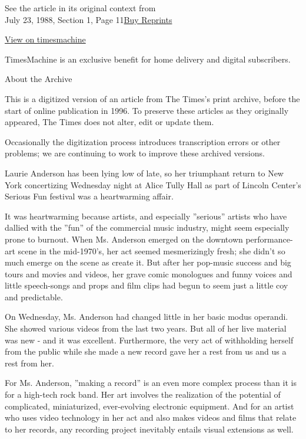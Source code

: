 See the article in its original context from\\
July 23, 1988, Section 1, Page
11\href{https://store.nytimes3xbfgragh.onion/collections/new-york-times-page-reprints?utm_source=nytimes\&utm_medium=article-page\&utm_campaign=reprints}{Buy
Reprints}

\href{http://timesmachine.nytimes3xbfgragh.onion/timesmachine/1988/07/23/054088.html}{View
on timesmachine}

TimesMachine is an exclusive benefit for home delivery and digital
subscribers.

About the Archive

This is a digitized version of an article from The Times's print
archive, before the start of online publication in 1996. To preserve
these articles as they originally appeared, The Times does not alter,
edit or update them.

Occasionally the digitization process introduces transcription errors or
other problems; we are continuing to work to improve these archived
versions.

Laurie Anderson has been lying low of late, so her triumphant return to
New York concertizing Wednesday night at Alice Tully Hall as part of
Lincoln Center's Serious Fun festival was a heartwarming affair.

It was heartwarming because artists, and especially ''serious'' artists
who have dallied with the ''fun'' of the commercial music industry,
might seem especially prone to burnout. When Ms. Anderson emerged on the
downtown performance-art scene in the mid-1970's, her act seemed
mesmerizingly fresh; she didn't so much emerge on the scene as create
it. But after her pop-music success and big tours and movies and videos,
her grave comic monologues and funny voices and little speech-songs and
props and film clips had begun to seem just a little coy and
predictable.

On Wednesday, Ms. Anderson had changed little in her basic modus
operandi. She showed various videos from the last two years. But all of
her live material was new - and it was excellent. Furthermore, the very
act of withholding herself from the public while she made a new record
gave her a rest from us and us a rest from her.

For Ms. Anderson, ''making a record'' is an even more complex process
than it is for a high-tech rock band. Her art involves the realization
of the potential of complicated, miniaturized, ever-evolving electronic
equipment. And for an artist who uses video technology in her act and
also makes videos and films that relate to her records, any recording
project inevitably entails visual extensions as well.

